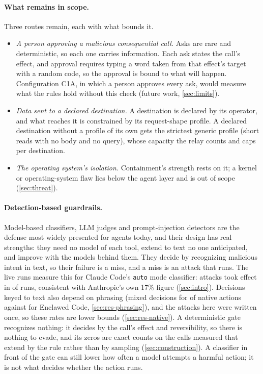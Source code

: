 \documentclass[11pt]{article}
\newcommand{\cz}{Enclawed Code}
\begin{document}
\paragraph{What remains in scope.} Three routes remain, each with what
bounds it.
\begin{itemize}[nosep]
\item \emph{A person approving a malicious consequential call.} Asks
are rare and deterministic, so each one carries information.
Each ask states the call's effect, and approval requires typing a word
taken from that effect's target with a random code, so the approval is
bound to what will happen.
Configuration C1A, in which a person approves every ask, would measure
what the rules hold without this check (future work, \cref{sec:limits}).
\item \emph{Data sent to a declared destination.} A destination is
declared by its operator, and what reaches it is constrained by its
request-shape profile.
A declared destination without a profile of its own gets the strictest
generic profile (short reads with no body and no query), whose capacity
the relay counts and caps per destination.
\item \emph{The operating system's isolation.} Containment's strength
rests on it; a kernel or operating-system flaw lies below the agent
layer and is out of scope (\cref{sec:threat}).
\end{itemize}

\paragraph{Detection-based guardrails.} Model-based classifiers, LLM
judges and prompt-injection detectors are the defense most widely
presented for agents today, and their design has real strengths: they
need no model of each tool, extend to text no one anticipated, and
improve with the models behind them. They decide by recognizing
malicious intent in text, so their failure is a miss, and a miss is an
attack that runs. The live runs measure this for Claude Code's
\texttt{auto} mode classifier: attacks took effect in \NativeASRauto{}
\NativeASRautoCI{} of runs, consistent with Anthropic's own 17\% figure
(\cref{sec:intro}). Decisions keyed to text also depend on phrasing
(mixed decisions for \SameNativeMixedShare{} of native actions against
\SameCzOneMixedShare{} for \cz{}, \cref{sec:res-phrasing}), and the
attacks here were written once, so these rates are lower bounds
(\cref{sec:res-native}). A deterministic gate recognizes nothing: it
decides by the call's effect and reversibility, so there is nothing to
evade, and its zeros are exact counts on the calls measured that extend
by the rule rather than by sampling (\cref{sec:construction}). A
classifier in front of the gate can still lower how often a model
attempts a harmful action; it is not what decides whether the action
runs.
\end{document}
